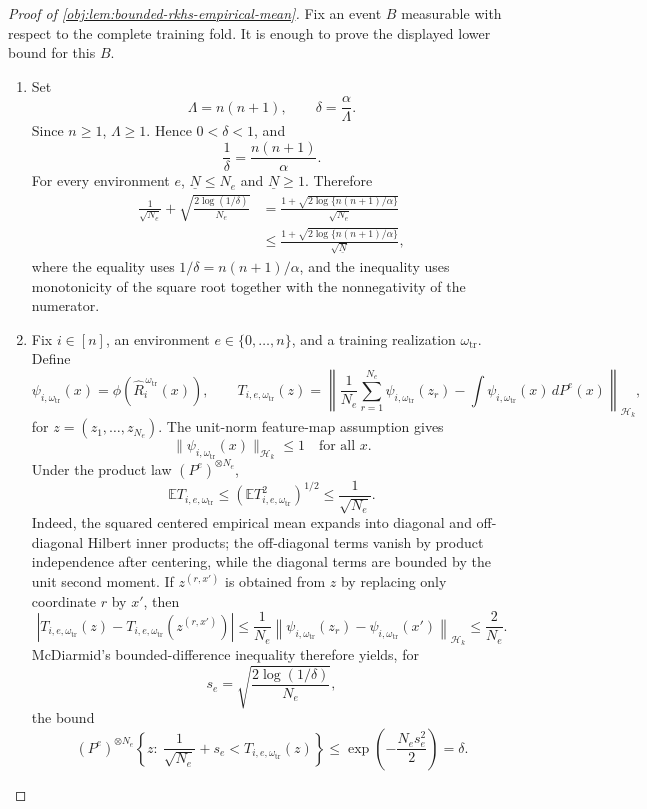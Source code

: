 \documentclass[11pt]{article}
\begin{document}
\begin{proof}[Proof of \cref{obj:lem:bounded-rkhs-empirical-mean}]
Fix an event \(B\) measurable with respect to the complete training fold.  It is enough to prove the displayed lower bound for this \(B\).

\begin{enumerate}
\item Set
\[
\Lambda=n(n+1),\qquad
\delta=\frac{\alpha}{\Lambda}.
\]
Since \(n\ge 1\), \(\Lambda\ge 1\).  Hence \(0<\delta<1\), and
\[
\frac1\delta=\frac{n(n+1)}{\alpha}.
\]
For every environment \(e\), \(\underline N\le N_e\) and \(\underline N\ge 1\).  Therefore
\[
\begin{aligned}
\frac{1}{\sqrt{N_e}}
+\sqrt{\frac{2\log(1/\delta)}{N_e}}
&=
\frac{1+\sqrt{2\log\{n(n+1)/\alpha\}}}{\sqrt{N_e}}\\
&\le
\frac{1+\sqrt{2\log\{n(n+1)/\alpha\}}}{\sqrt{\underline N}},
\end{aligned}
\]
where the equality uses \(1/\delta=n(n+1)/\alpha\), and the inequality uses monotonicity of the square root together with the nonnegativity of the numerator. %

\item Fix \(i\in[n]\), an environment \(e\in\{0,\ldots,n\}\), and a training realization \(\omega_{\mathrm{tr}}\).  Define
\[
\psi_{i,\omega_{\mathrm{tr}}}(x)
=
\phi\!\left(\widehat R_i^{\,\omega_{\mathrm{tr}}}(x)\right),
\qquad
T_{i,e,\omega_{\mathrm{tr}}}(z)
=
\left\|
\frac1{N_e}\sum_{r=1}^{N_e}\psi_{i,\omega_{\mathrm{tr}}}(z_r)
-
\int \psi_{i,\omega_{\mathrm{tr}}}(x)\,dP^e(x)
\right\|_{\mathcal H_k},
\]
for \(z=(z_1,\ldots,z_{N_e})\).  The unit-norm feature-map assumption gives
\[
\|\psi_{i,\omega_{\mathrm{tr}}}(x)\|_{\mathcal H_k}\le 1
\quad\text{for all }x .
\]
Under the product law \((P^e)^{\otimes N_e}\),
\[
\mathbb E T_{i,e,\omega_{\mathrm{tr}}}
\le
\left(\mathbb E T_{i,e,\omega_{\mathrm{tr}}}^2\right)^{1/2}
\le
\frac1{\sqrt{N_e}}.
\]
Indeed, the squared centered empirical mean expands into diagonal and off-diagonal Hilbert inner products; the off-diagonal terms vanish by product independence after centering, while the diagonal terms are bounded by the unit second moment.  If \(z^{(r,x')}\) is obtained from \(z\) by replacing only coordinate \(r\) by \(x'\), then
\[
\left|
T_{i,e,\omega_{\mathrm{tr}}}(z)
-
T_{i,e,\omega_{\mathrm{tr}}}(z^{(r,x')})
\right|
\le
\frac1{N_e}
\left\|\psi_{i,\omega_{\mathrm{tr}}}(z_r)-\psi_{i,\omega_{\mathrm{tr}}}(x')\right\|_{\mathcal H_k}
\le
\frac2{N_e}.
\]
McDiarmid's bounded-difference inequality therefore yields, for
\[
s_e=\sqrt{\frac{2\log(1/\delta)}{N_e}},
\]
the bound
\[
(P^e)^{\otimes N_e}
\left\{
z:\ 
\frac1{\sqrt{N_e}}+s_e
<
T_{i,e,\omega_{\mathrm{tr}}}(z)
\right\}
\le
\exp\!\left(-\frac{N_e s_e^2}{2}\right)
=
\delta .
\]


\end{enumerate}
\end{proof}
\end{document}
